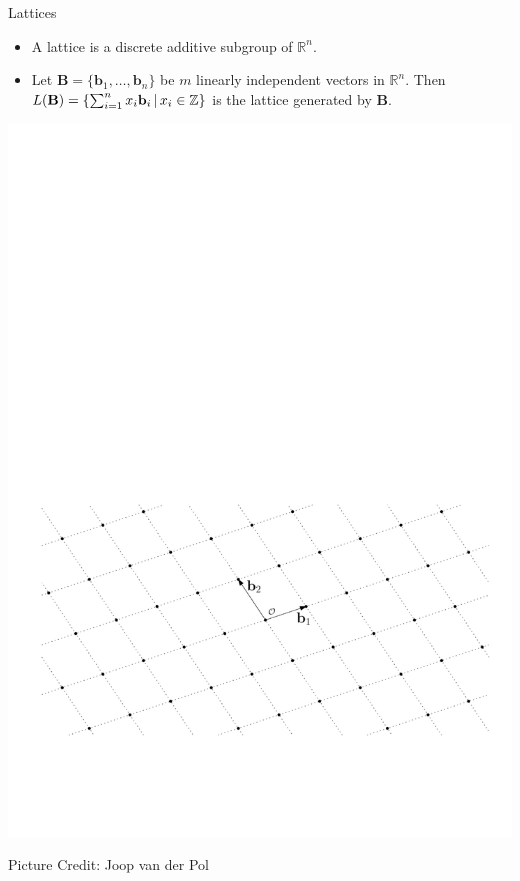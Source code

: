 \documentclass[presentation,smaller]{beamer}
\newcommand{\ZZ}[1][blank]{\ensuremath{\ifthenelse{\equal{#1}{blank}}{\mathbb{Z}}{\mathbb{Z}\left[#1\right]}\xspace}}
\renewcommand{\vec}[1]{\ensuremath{\mathbf{#1}}\xspace}
\begin{document}
\begin{frame}[label={sec:orgheadline9}]{Lattices}
\begin{itemize}
\item A lattice is a discrete additive subgroup of \(\mathbb{R}^n\).

\item Let \(\vec{B} = \{ \vec{b}_1, \ldots, \vec{b}_n \}\) be \(m\) linearly independent vectors in \(\mathbb{R}^n\). Then \(L(\vec{B})=\{ \sum_{i=1}^{n} x_i \vec{b}_i \,|\, x_i \in \ZZ\}\) is the lattice generated by \(\vec{B}\).
\end{itemize}

\includegraphics[width=.9\linewidth]{./joop-latt1.pdf}

\tiny Picture Credit: Joop van der Pol
\end{frame}
\end{document}
